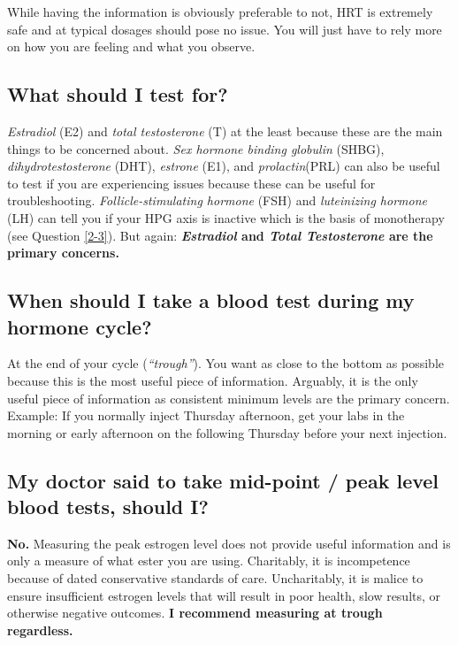 \documentclass{article}
\begin{document}
While having the information is obviously preferable to not, HRT is extremely safe and at typical dosages should pose no issue. You will just have to rely more on how you are feeling and what you observe.

\subsection{What should I test for?}

\textit{Estradiol} (E2) and \textit{total testosterone} (T) at the least because these are the main things to be concerned about. \textit{Sex hormone binding globulin} (SHBG), \textit{dihydrotestosterone} (DHT), \textit{estrone} (E1), and \textit{prolactin}(PRL) can also be useful to test if you are experiencing issues because these can be useful for troubleshooting. \textit{Follicle-stimulating hormone} (FSH) and \textit{luteinizing hormone} (LH) can tell you if your HPG axis is inactive which is the basis of monotherapy (see Question \ref{2-3}). But again: \textbf{\textit{Estradiol} and \textit{Total Testosterone} are the primary concerns.}

\subsection{When should I take a blood test during my hormone cycle?}

At the end of your cycle (\textit{“trough”}). You want as close to the bottom as possible because this is the most useful piece of information. Arguably, it is the only useful piece of information as consistent minimum levels are the primary concern. Example: If you normally inject Thursday afternoon, get your labs in the morning or early afternoon on the following Thursday before your next injection.

\subsection{My doctor said to take mid-point / peak level blood tests, should I?}

\textbf{No.} Measuring the peak estrogen level does not provide useful information and is only a measure of what ester you are using. Charitably, it is incompetence because of dated conservative standards of care. Uncharitably, it is malice to ensure insufficient estrogen levels that will result in poor health, slow results, or otherwise negative outcomes. \textbf{I recommend measuring at trough regardless.}
\end{document}
